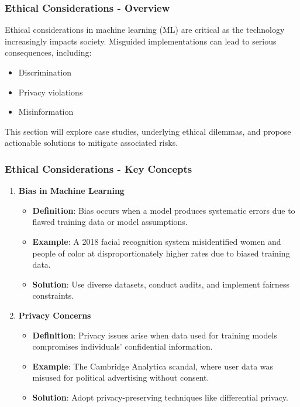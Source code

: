 \documentclass[aspectratio=169]{beamer}
\begin{document}
\begin{frame}[fragile]
    \frametitle{Ethical Considerations - Overview}
    Ethical considerations in machine learning (ML) are critical as the technology increasingly impacts society. Misguided implementations can lead to serious consequences, including:
    \begin{itemize}
        \item Discrimination
        \item Privacy violations
        \item Misinformation
    \end{itemize}
    This section will explore case studies, underlying ethical dilemmas, and propose actionable solutions to mitigate associated risks.
\end{frame}

\begin{frame}[fragile]
    \frametitle{Ethical Considerations - Key Concepts}
    \begin{enumerate}
        \item \textbf{Bias in Machine Learning}
        \begin{itemize}
            \item \textbf{Definition}: Bias occurs when a model produces systematic errors due to flawed training data or model assumptions.
            \item \textbf{Example}: A 2018 facial recognition system misidentified women and people of color at disproportionately higher rates due to biased training data.
            \item \textbf{Solution}: Use diverse datasets, conduct audits, and implement fairness constraints.
        \end{itemize}
        
        \item \textbf{Privacy Concerns}
        \begin{itemize}
            \item \textbf{Definition}: Privacy issues arise when data used for training models compromises individuals' confidential information.
            \item \textbf{Example}: The Cambridge Analytica scandal, where user data was misused for political advertising without consent.
            \item \textbf{Solution}: Adopt privacy-preserving techniques like differential privacy.
        \end{itemize}
        

\end{enumerate}
\end{frame}
\end{document}
